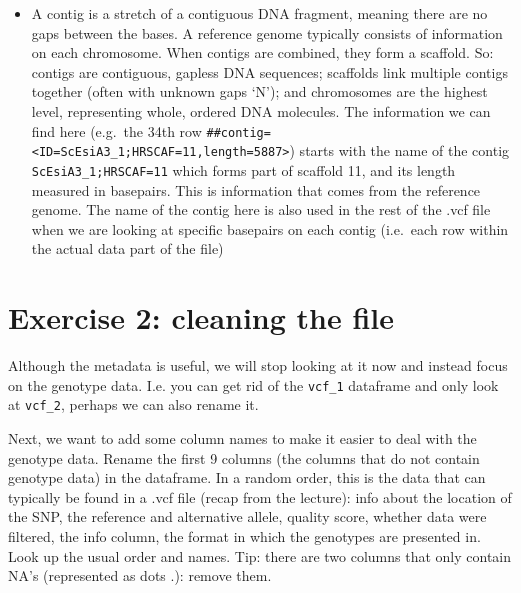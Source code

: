 \documentclass[
  letterpaper,
  DIV=11,
  numbers=noendperiod]{scrreprt}
\providecommand{\tightlist}{%
  \setlength{\itemsep}{0pt}\setlength{\parskip}{0pt}}\usepackage{longtable,booktabs,array}
\begin{document}
\begin{tcolorbox}
\begin{itemize}
\tightlist
\item
  A contig is a stretch of a contiguous DNA fragment, meaning there are
  no gaps between the bases. A reference genome typically consists of
  information on each chromosome. When contigs are combined, they form a
  scaffold. So: contigs are contiguous, gapless DNA sequences; scaffolds
  link multiple contigs together (often with unknown gaps `N'); and
  chromosomes are the highest level, representing whole, ordered DNA
  molecules. The information we can find here (e.g.~the 34th row
  \texttt{\#\#contig=\textless{}ID=ScEsiA3\_1;HRSCAF=11,length=5887\textgreater{}})
  starts with the name of the contig \texttt{ScEsiA3\_1;HRSCAF=11} which
  forms part of scaffold 11, and its length measured in basepairs. This
  is information that comes from the reference genome. The name of the
  contig here is also used in the rest of the .vcf file when we are
  looking at specific basepairs on each contig (i.e.~each row within the
  actual data part of the file)
\end{itemize}

\end{tcolorbox}

\section{Exercise 2: cleaning the
file}\label{exercise-2-cleaning-the-file}

Although the metadata is useful, we will stop looking at it now and
instead focus on the genotype data. I.e. you can get rid of the
\texttt{vcf\_1} dataframe and only look at \texttt{vcf\_2}, perhaps we
can also rename it.

Next, we want to add some column names to make it easier to deal with
the genotype data. Rename the first 9 columns (the columns that do not
contain genotype data) in the dataframe. In a random order, this is the
data that can typically be found in a .vcf file (recap from the
lecture): info about the location of the SNP, the reference and
alternative allele, quality score, whether data were filtered, the info
column, the format in which the genotypes are presented in. Look up the
usual order and names. Tip: there are two columns that only contain NA's
(represented as dots .): remove them.
\end{document}
